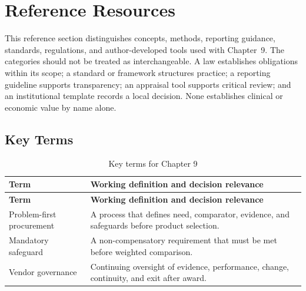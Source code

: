 \section{Reference Resources}
\label{sec:comp-ch09-reference}

This reference section distinguishes concepts, methods, reporting guidance,
standards, regulations, and author-developed tools used with Chapter~9. The
categories should not be treated as interchangeable. A law establishes obligations
within its scope; a standard or framework structures practice; a reporting guideline
supports transparency; an appraisal tool supports critical review; and an
institutional template records a local decision. None establishes clinical or
economic value by name alone. 

\subsection{Key Terms}
\begin{longtable}{@{}p{}p{}@{}}
\caption{Key terms for Chapter 9}
\label{tab:comp-ch09-key-terms}\\
\toprule
\textbf{Term} & \textbf{Working definition and decision relevance} \\
\midrule
\endfirsthead
\toprule
\textbf{Term} & \textbf{Working definition and decision relevance} \\
\midrule
\endhead
\bottomrule
\endlastfoot
Problem-first procurement & A process that defines need, comparator, evidence, and safeguards before product selection. \\
Mandatory safeguard & A non-compensatory requirement that must be met before weighted comparison. \\
Vendor governance & Continuing oversight of evidence, performance, change, continuity, and exit after award. \\
\end{longtable}

